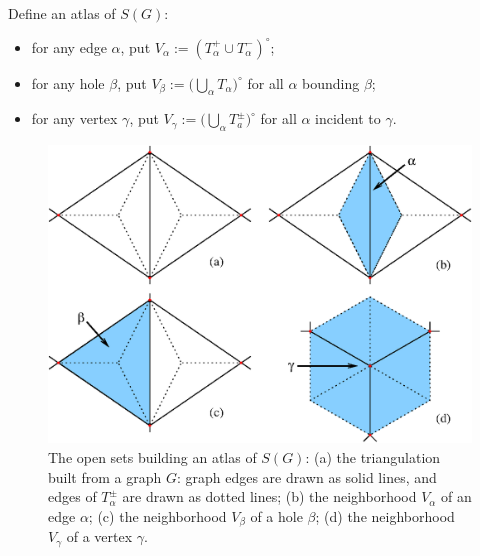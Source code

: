Define an atlas of $S(G)$:
\begin{itemize}
\item for any edge $\alpha$, put $V_\alpha := (T_\alpha^+ \cup T_\alpha^-)^\circ$;
\item for any hole $\beta$, put $V_\beta := \bigl( \bigcup_{\alpha} T_\alpha \bigr)^\circ$
  for all $\alpha$ bounding $\beta$;
\item for any vertex $\gamma$, put $V_\gamma := \bigl( \bigcup_\alpha T_a^\pm \bigr)^\circ$
  for all $\alpha$ incident to $\gamma$.
\end{itemize}
\begin{figure}[btp]
  \centering\includegraphics[width=\textwidth]{atlas}
  \caption{The open sets building an atlas of $S(G)$: (a) the
    triangulation built from a graph $G$: graph edges are drawn as
    solid lines, and edges of $T_\alpha^{\pm}$ are drawn as dotted lines; (b)
    the neighborhood $V_\alpha$ of an edge $\alpha$; (c) the neighborhood $V_\beta$
    of a hole $\beta$; (d) the neighborhood $V_\gamma$ of a vertex $\gamma$.}
  \label{fig:atlas}
\end{figure}

